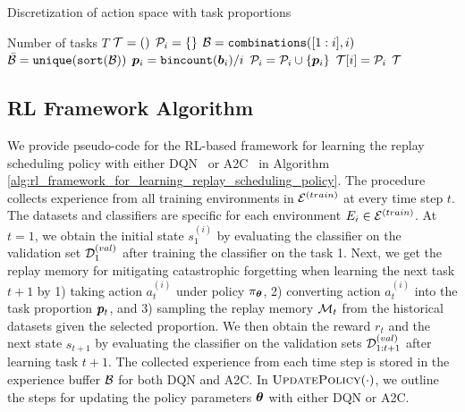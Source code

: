 \begin{algorithm}[t]
	\small
	\caption{Discretization of action space with task proportions}
	\label{alg:action_space_discretization_paperD}
	\begin{algorithmic}[1]
		\Require Number of tasks $T$
		\State ${\mathcal{T}} = ()$ 
		\State ${\mathcal{P}}_i = \{\}$ 
		\State ${\mathcal{B}} = \texttt{combinations}([1:i], i)$ 
		\State $\bar{{\mathcal{B}}} = \texttt{unique}(\texttt{sort}({\mathcal{B}}))$ 
		\State ${\bm{p}}_i = \texttt{bincount}({\bm{b}}_i) / i$ 
		\State ${\mathcal{P}}_i = {\mathcal{P}}_i \cup \{ {\bm{p}}_i \}$ 
		\EndFor
		\State ${\mathcal{T}}[i] = {\mathcal{P}}_i$ 
		\EndFor
		\State \Return ${\mathcal{T}}$ 
	\end{algorithmic}
\end{algorithm}



\subsection{RL Framework Algorithm}\label{paperD:app:rl_framework_algorithm}

We provide pseudo-code for the RL-based framework for learning the replay scheduling policy with either DQN~ or A2C~ in Algorithm \ref{alg:rl_framework_for_learning_replay_scheduling_policy}. The procedure collects experience from all training environments in ${\mathcal{E}}^{(train)}$ at every time step $t$. The datasets and classifiers are specific for each environment $E_i \in {\mathcal{E}}^{(train)}$. At $t=1$, we obtain the initial state $s_1^{(i)}$ by evaluating the classifier on the validation set ${\mathcal{D}}_1^{(val)}$ after training the classifier on the task 1. Next, we get the replay memory for mitigating catastrophic forgetting when learning the next task $t+1$ by 1) taking action $a_t^{(i)}$ under policy $\pi_{{\bm{\theta}}}$, 2) converting action $a_t^{(i)}$ into the task proportion ${\bm{p}}_{t}$, and 3) sampling the replay memory ${\mathcal{M}}_t$ from the historical datasets given the selected proportion. We then obtain the reward $r_t$ and the next state $s_{t+1}$ by evaluating the classifier on the validation sets ${\mathcal{D}}_{1:t+1}^{(val)}$ after learning task $t+1$. The collected experience from each time step is stored in the experience buffer ${\mathcal{B}}$ for both DQN and A2C. In $\textsc{UpdatePolicy}(\cdot)$, we outline the steps for updating the policy parameters ${\bm{\theta}}$ with either DQN or A2C. 

